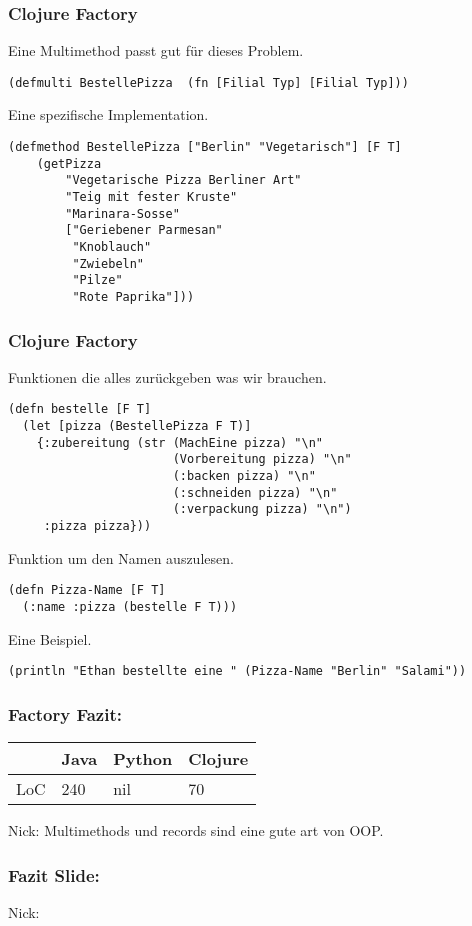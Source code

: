\documentclass[compress, blue]{beamer}
\begin{document}
\begin{frame}[fragile]\frametitle{Clojure Factory}

Eine Multimethod passt gut für dieses Problem.

\begin{lstlisting}
(defmulti BestellePizza  (fn [Filial Typ] [Filial Typ]))
\end{lstlisting}

Eine spezifische Implementation.

\begin{lstlisting}
(defmethod BestellePizza ["Berlin" "Vegetarisch"] [F T]
    (getPizza 
        "Vegetarische Pizza Berliner Art"
        "Teig mit fester Kruste"
        "Marinara-Sosse"
        ["Geriebener Parmesan" 
         "Knoblauch" 
         "Zwiebeln" 
         "Pilze" 
         "Rote Paprika"]))
\end{lstlisting}
\end{frame}

\begin{frame}[fragile]\frametitle{Clojure Factory}

Funktionen die alles zurückgeben was wir brauchen.
\begin{lstlisting}
(defn bestelle [F T]
  (let [pizza (BestellePizza F T)]
    {:zubereitung (str (MachEine pizza) "\n"
                       (Vorbereitung pizza) "\n"
                       (:backen pizza) "\n"
                       (:schneiden pizza) "\n"
                       (:verpackung pizza) "\n")
     :pizza pizza}))
\end{lstlisting}

Funktion um den Namen auszulesen.

\begin{lstlisting}
(defn Pizza-Name [F T]
  (:name :pizza (bestelle F T)))
\end{lstlisting}

Eine Beispiel.

\begin{lstlisting}
(println "Ethan bestellte eine " (Pizza-Name "Berlin" "Salami"))
\end{lstlisting}

\end{frame}






\begin{frame}\frametitle{Factory Fazit:}
    \begin{tabular}{l | l l l}
         & Java &  Python & Clojure  \\
     \hline
        LoC & 240 &  nil & 70 \\
     \end{tabular}
 
  \begin{block}{Nick:}
    Multimethods und records sind eine gute art von OOP.
  \end{block}
\end{frame}





\begin{frame}\frametitle{Fazit Slide:}
  \begin{block}{Nick:}
  

  \end{block}
\end{frame}
\end{document}
